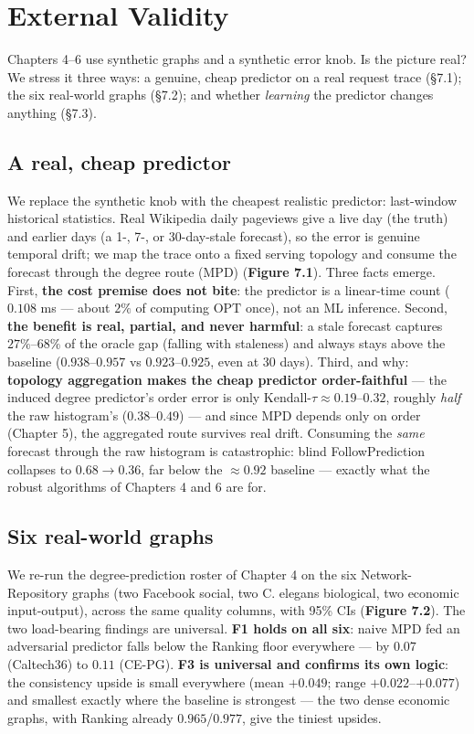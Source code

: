 \chapter{External Validity}\label{external-validity}

Chapters 4--6 use synthetic graphs and a synthetic error knob. Is the picture real? We stress
it three ways: a genuine, cheap predictor on a real request trace (§7.1); the six real-world
graphs (§7.2); and whether \emph{learning} the predictor changes anything (§7.3).

\section{A real, cheap predictor}\label{a-real-cheap-predictor}

We replace the synthetic knob with the cheapest realistic predictor: last-window historical
statistics. Real Wikipedia daily pageviews give a live day (the truth) and earlier days (a
1-, 7-, or 30-day-stale forecast), so the error is genuine temporal drift; we map the trace
onto a fixed serving topology and consume the forecast through the degree route (MPD)
(\textbf{Figure 7.1}). Three facts emerge. First, \textbf{the cost premise does not bite}: the
predictor is a linear-time count (\(0.108\) ms --- about \(2\%\) of computing \(\mathrm{OPT}\) once),
not an ML inference. Second, \textbf{the benefit is real, partial, and never harmful}: a stale
forecast captures \(27\%\)--\(68\%\) of the oracle gap (falling with staleness) and always stays
above the baseline (\(0.938\)--\(0.957\) vs \(0.923\)--\(0.925\), even at 30 days). Third, and why:
\textbf{topology aggregation makes the cheap predictor order-faithful} --- the induced degree
predictor's order error is only Kendall-\(\tau\approx0.19\)--\(0.32\), roughly \emph{half} the raw
histogram's (\(0.38\)--\(0.49\)) --- and since MPD depends only on order (Chapter 5), the aggregated
route survives real drift. Consuming the \emph{same} forecast through the raw histogram is
catastrophic: blind FollowPrediction collapses to \(0.68\to0.36\), far below the \(\approx0.92\)
baseline --- exactly what the robust algorithms of Chapters 4 and 6 are for.

\section{Six real-world graphs}\label{six-real-world-graphs}

We re-run the degree-prediction roster of Chapter 4 on the six Network-Repository graphs (two
Facebook social, two C. elegans biological, two economic input-output), across the same
quality columns, with 95\% CIs (\textbf{Figure 7.2}). The two load-bearing findings are universal.
\textbf{F1 holds on all six}: naive MPD fed an adversarial predictor falls below the Ranking floor
everywhere --- by \(0.07\) (Caltech36) to \(0.11\) (CE-PG). \textbf{F3 is universal and confirms its own
logic}: the consistency upside is small everywhere (mean \(+0.049\); range \(+0.022\)--\(+0.077\))
and smallest exactly where the baseline is strongest --- the two dense economic graphs, with
Ranking already \(0.965\)/\(0.977\), give the tiniest upsides.

